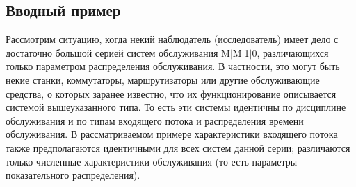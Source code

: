 \begin{multicols}{2}






\section{Вводный пример}


Рассмотрим ситуацию, когда некий наблюдатель (исследователь) имеет дело с достаточно большой серией систем обслуживания
M$\vert$M$\vert$1$\vert$0, различающихся только параметром распределения %
обслу\-жи\-ва\-ния. В частности, это могут быть некие станки,
коммутаторы, маршрутизаторы или другие обслуживающие средства, о которых заранее известно, что их функционирование
описывается системой вышеуказанного типа. То есть эти сис\-те\-мы идентичны по дисциплине обслуживания и по типам входящего
потока и распределения времени обслуживания. В рассматриваемом примере характеристики входящего потока также предполагаются
идентичными для всех систем данной серии; различаются только численные характеристики обслуживания (то есть параметры
показательного распределения).


\end{multicols}
